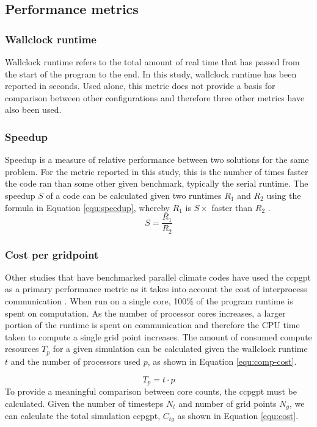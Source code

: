 \documentclass[a4paper,11pt]{report}
\begin{document}
\subsection{Performance metrics}

\subsubsection{Wallclock runtime} 
Wallclock runtime refers to the total amount of real time that has passed from the start of the program to the end. In this study, wallclock runtime has been reported in seconds. Used alone, this metric does not provide a basis for comparison between other configurations and therefore three other metrics have also been used.
	
\subsubsection{Speedup} 
Speedup is a measure of relative performance between two solutions for the same problem. For the metric reported in this study, this is the number of times faster the code ran than some other given benchmark, typically the serial runtime. The speedup $S$ of a code can be calculated given two runtimes $R_1$ and $R_2$ using the formula in Equation \ref{equ:speedup}, whereby $R_1$ is $S\times$ faster than $R_2$ \cite{kumar1994analyzing}.
\begin{equation}
S = \frac{R_1}{R_2} 
\label{equ:speedup}
\end{equation}
	
\subsubsection{Cost per gridpoint}
Other studies that have benchmarked parallel climate codes have used the \gls{ccpgpt} as a primary performance metric as it takes into account the cost of interprocess communication \cite{schmidt2007benchmark}. When run on a single core, 100\% of the program runtime is spent on computation. As the number of processor cores increases, a larger portion of the runtime is spent on communication and therefore the CPU time taken to compute a single grid point increases. The amount of consumed compute resources $T_p$ for a given simulation can be calculated given the wallclock runtime $t$ and the number of processors used $p$, as shown in Equation \ref{equ:comp-cost}.
\par
\begin{equation}
T_p = t \cdot p
\label{equ:comp-cost}
\end{equation}
To provide a meaningful comparison between core counts, the \gls{ccpgpt} must be calculated. Given the number of timesteps $N_t$ and number of grid points $N_g$, we can calculate the total simulation \gls{ccpgpt}, $C_{tg}$ as shown in Equation \ref{equ:cost}. 
\end{document}
